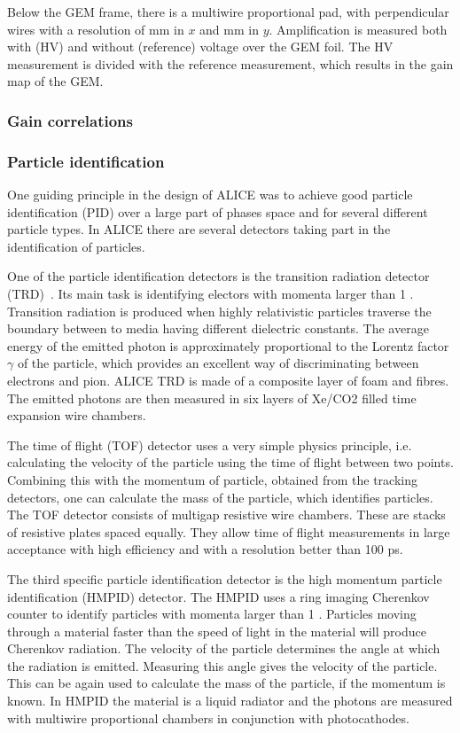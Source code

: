 Below the GEM frame, there is a multiwire proportional pad, with perpendicular wires with a resolution of \unit[4]{mm} in $x$ and \unit[3]{mm} in $y$. Amplification is measured both with (HV) and without (reference) voltage over the GEM foil. The HV measurement is divided with the reference measurement, which results in the gain map of the GEM.

\subsubsection*{Gain correlations}

\subsubsection{Particle identification}
One guiding principle in the design of ALICE was to achieve good particle identification (PID) over  a large part of phases space and for several different particle types. In ALICE there are several detectors taking part in the identification of particles. 

One of the particle identification detectors is the transition radiation detector (TRD)~\cite{trd}. Its main task is identifying electors with momenta larger than 1 \gev. Transition radiation is produced when highly relativistic particles traverse the boundary between to media having different dielectric constants. The average energy of the emitted photon is approximately proportional to the Lorentz factor $\gamma$ of the particle, which provides an excellent way of discriminating between electrons and pion. ALICE TRD is made of a composite layer of foam and fibres. The emitted photons are then measured in six layers of Xe/CO2 filled time expansion wire chambers. 

The time of flight  (TOF) detector uses a very simple physics principle, i.e. calculating the velocity of the particle using the time of flight between two points. Combining this with the momentum of particle, obtained from the tracking detectors, one can calculate the mass of the particle, which identifies particles. The TOF detector consists of multigap resistive wire chambers. These are stacks of resistive plates spaced equally. They allow time of flight measurements in large acceptance with high efficiency and with a resolution better than 100 ps. 

The third specific particle identification detector is the high momentum particle identification (HMPID) detector. The HMPID uses a ring imaging Cherenkov counter to identify particles with momenta larger than 1 \gev. Particles moving through a material faster than the speed of light in the material will produce Cherenkov radiation. The velocity of the particle determines the angle at which the radiation is emitted. Measuring this angle gives the velocity of the particle. This can be again used to calculate the mass of the particle, if the momentum is known. In HMPID the material is a liquid radiator and the photons are measured with multiwire proportional chambers in conjunction with photocathodes. 

